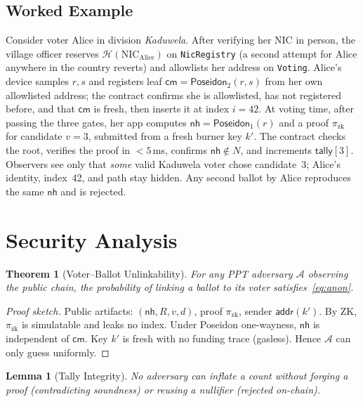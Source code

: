 \documentclass[conference]{IEEEtran}
\theoremstyle{definition}
\theoremstyle{plain}
\newtheorem{theorem}{Theorem}
\newtheorem{lemma}{Lemma}
\newcommand{\Poseidon}{\mathsf{Poseidon}}
\newcommand{\Hash}{\mathcal{H}}
\newcommand{\nullhash}{\mathsf{nh}}
\newcommand{\commit}{\mathsf{cm}}
\newcommand{\adv}{\mathcal{A}}
\begin{document}
\subsection{Worked Example}
Consider voter Alice in division \emph{Kaduwela}. After verifying her NIC in person, the village officer reserves $\Hash(\text{NIC}_{\text{Alice}})$ on \texttt{NicRegistry} (a second attempt for Alice anywhere in the country reverts) and allowlists her address on \texttt{Voting}. Alice's device samples $r,s$ and registers leaf $\commit=\Poseidon_2(r,s)$ from her own allowlisted address; the contract confirms she is allowlisted, has not registered before, and that $\commit$ is fresh, then inserts it at index $i{=}42$. At voting time, after passing the three gates, her app computes $\nullhash=\Poseidon_1(r)$ and a proof $\pi_{\text{zk}}$ for candidate $v{=}3$, submitted from a fresh burner key $k'$. The contract checks the root, verifies the proof in ${<}5$\,ms, confirms $\nullhash\notin N$, and increments $\mathsf{tally}[3]$. Observers see only that \emph{some} valid Kaduwela voter chose candidate~3; Alice's identity, index~42, and path stay hidden. Any second ballot by Alice reproduces the same $\nullhash$ and is rejected.

\section{Security Analysis}

\begin{theorem}[Voter--Ballot Unlinkability]
\label{thm:anon}
For any PPT adversary $\adv$ observing the public chain, the probability of linking a ballot to its voter satisfies~\eqref{eq:anon}.
\end{theorem}

\begin{proof}[Proof sketch]
Public artifacts: $(\nullhash,R,v,d)$, proof $\pi_{\text{zk}}$, sender $\mathsf{addr}(k')$. By ZK, $\pi_{\text{zk}}$ is simulatable and leaks no index. Under Poseidon one-wayness, $\nullhash$ is independent of $\commit$. Key $k'$ is fresh with no funding trace (gasless). Hence $\adv$ can only guess uniformly.
\end{proof}

\begin{lemma}[Tally Integrity]
No adversary can inflate a count without forging a proof (contradicting soundness) or reusing a nullifier (rejected on-chain).
\end{lemma}
\end{document}
